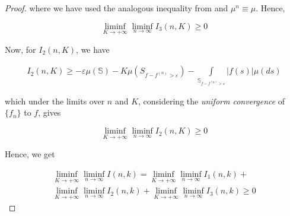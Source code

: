 \documentclass{amsart}
\theoremstyle{named}
\begin{document}
\begin{proof}
    where we have used the analogous inequality from \cite{feinberg2015uniform} and $\mu^n \equiv \mu$. Hence,

    \begin{equation*}
        \liminf\limits_{K \rightarrow +\infty}\liminf\limits_{n \rightarrow \infty} I_3 (n,K) \geq 0
    \end{equation*}

    Now, for $I_2 (n,K)$, we have

    \begin{gather*}
        I_2 (n,K) \geq - \varepsilon \mu(\mathbb{S}) - K \mu(S_{f - f^{(n)} > \varepsilon}) - \int\limits_{\mathbb{S}_{f - f^{(n)} > \varepsilon}} |f(s)| \mu(ds) 
    \end{gather*}

    which under the limits over $n$ and $K$, considering the \textit{uniform convergence} of $\{f_n\}$ to $f$, gives

    \begin{equation*}
        \liminf\limits_{K \rightarrow +\infty}\liminf\limits_{n \rightarrow \infty} I_2(n,K) \geq 0
    \end{equation*}

    Hence, we get 

    \begin{gather*}
        \liminf\limits_{K \rightarrow +\infty}\liminf\limits_{n \rightarrow \infty} I(n,k) = \liminf\limits_{K \rightarrow +\infty}\liminf\limits_{n \rightarrow \infty} I_1(n,k) + \\ \liminf\limits_{K \rightarrow +\infty}\liminf\limits_{n \rightarrow \infty} I_2(n,k) + \liminf\limits_{K \rightarrow +\infty}\liminf\limits_{n \rightarrow \infty} I_3(n,k) \geq 0
    \end{gather*}
    
\end{proof}
\end{document}
